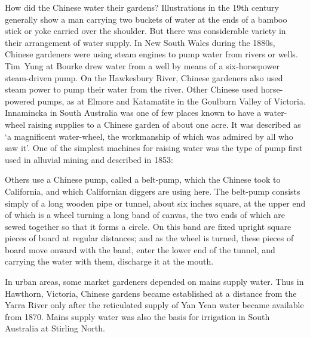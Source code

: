 How did the Chinese  water their gardens?
Illustrations in the 19th century generally show a man carrying two
buckets of water at the ends of a bamboo stick or yoke carried over
the shoulder.  But there was considerable variety in their arrangement
of water supply.  In New South Wales during the 1880s, Chinese
gardeners were using steam engines to pump water from rivers or wells.
Tim~Yung at Bourke drew water from a well by means of a six-horsepower
steam-driven pump.  On the Hawkesbury River,
 Chinese gardeners also used steam power to
pump their water from the river.  Other Chinese used horse-powered
pumps,  as at Elmore and Katamatite in the
Goulburn Valley  of Victoria.  Innamincka
 in
South Australia was one of few places known to have a water-wheel
raising supplies to a Chinese garden of about one acre.  It was
described as `a magnificent water-wheel, the workmanship of which was
admired by all who saw it'.  One of the simplest machines for
raising water was the type of pump  first used in
alluvial mining and described in 1853:
\begin{Quote}	
	Others use a Chinese pump, called a belt-pump, which the
	Chinese took to California, and which Californian diggers are
	using here.  The belt-pump consists simply of a long wooden
	pipe or tunnel, about six inches square, at the upper end of
	which is a wheel turning a long band of canvas, the two ends
	of which are sewed together so that it forms a circle.  On
	this band are fixed upright square pieces of board at regular
	distances; and as the wheel is turned, these pieces of board
	move onward with the band, enter the lower end of the tunnel,
	and carrying the water with them, discharge it at the
	mouth.
\end{Quote}

In urban areas, some market gardeners depended on mains supply water.
Thus in Haw\-th\-orn,  Victoria, Chinese gardens
became established at a distance from the Yarra River
 only after the reticulated supply of Yan Yean
 water became available from 1870.  Mains
supply water was also the basis for irrigation in South Australia at
Stirling 
North.

